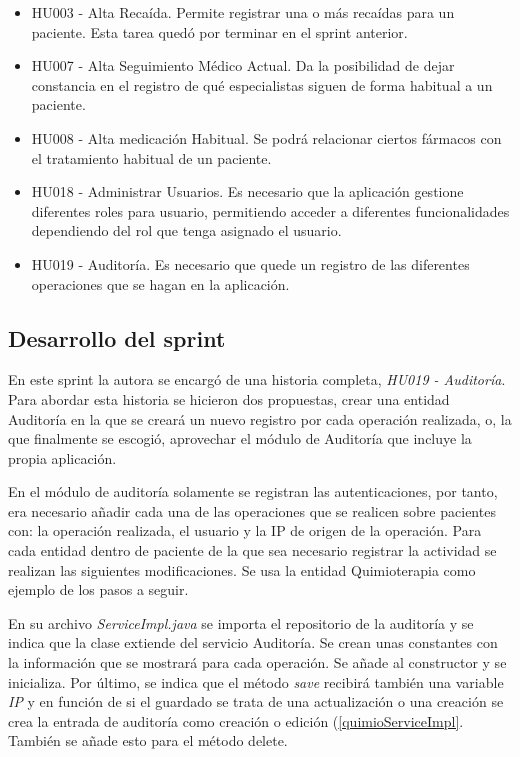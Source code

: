 \begin{itemize}
\item HU003 - Alta Recaída. Permite registrar una o más recaídas para un paciente. Esta tarea quedó por terminar en el sprint anterior.
\item HU007 - Alta Seguimiento Médico Actual. Da la posibilidad de dejar constancia en el registro de qué especialistas siguen de forma habitual a un paciente.
\item HU008 - Alta medicación Habitual. Se podrá relacionar ciertos fármacos con el tratamiento habitual de un paciente.
\item HU018 - Administrar Usuarios. Es necesario que la aplicación gestione diferentes roles para usuario, permitiendo acceder a diferentes funcionalidades dependiendo del rol que tenga asignado el usuario.
\item HU019 - Auditoría. Es necesario que quede un registro de las diferentes operaciones que se hagan en la aplicación.

\end{itemize}

\subsection{Desarrollo del sprint}
\label{subsec:S3-desarrollo}

En este sprint la autora se encargó de una historia completa, \emph{HU019 - Auditoría}. Para abordar esta historia se hicieron dos propuestas, crear una entidad Auditoría en la que se creará un nuevo registro por cada operación realizada, o, la que finalmente se escogió, aprovechar el módulo de Auditoría que incluye la propia aplicación. 

En el módulo de auditoría solamente se registran las autenticaciones, por tanto, era necesario añadir cada una de las operaciones que se realicen sobre pacientes con: la operación realizada, el usuario y la IP de origen de la operación. Para cada entidad dentro de paciente de la que sea necesario registrar la actividad se realizan las siguientes modificaciones. Se usa la entidad Quimioterapia como ejemplo de los pasos a seguir. 

En su archivo \emph{ServiceImpl.java} se importa el repositorio de la auditoría y se indica que la clase extiende del servicio Auditoría. Se crean unas constantes con la información que se mostrará para cada operación. Se añade al constructor y se inicializa. Por último, se indica que el método \emph{save} recibirá también una variable \emph{IP} y en función de si el guardado se trata de una actualización o una creación se crea la entrada de auditoría como creación o edición (\ref{quimioServiceImpl}. También se añade esto para el método delete.


